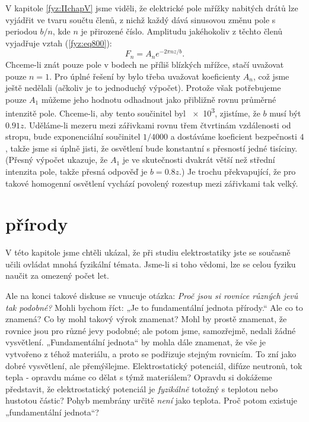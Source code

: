     V kapitole \ref{fyz:IIchapV} jsme viděli, že elektrické pole mřížky nabitých drátů lze vyjádřit
    ve tvaru součtu členů, z nichž každý dává sinusovou změnu pole s periodou \(b/n\), kde \(n\) je
    přirozené číslo. Amplitudu jakéhokoliv z těchto členů vyjadřuje vztah (\ref{fyz:eq800}):
    \begin{equation*}
      F_n=A_ne^{−2πnz/b}.
    \end{equation*}
    Chceme-li znát pouze pole v bodech ne příliš blízkých mřížce, stačí uvažovat pouze \(n=1\). Pro
    úplné řešení by bylo třeba uvažovat koeficienty \(A_n\), což jsme ještě nedělali (ačkoliv je to
    jednoduchý výpočet). Protože však potřebujeme pouze \(A_1\) můžeme jeho hodnotu odhadnout jako
    přibližně rovnu průměrné intenzitě pole. Chceme-li, aby tento součinitel byl \num{e3}, zjistíme,
    že \(b\) musí být \(\num{0.91}z\). Uděláme-li mezeru mezi zářivkami rovnu třem čtvrtinám
    vzdálenosti od stropu, bude exponenciální součinitel \(1/4000\) a dostáváme koeficient
    bezpečnosti \(4\), takže jsme si úplně jisti, že osvětlení bude konstantní s přesností jedné
    tisíciny. (Přesný výpočet ukazuje, že \(A_1\) je ve skutečnosti dvakrát větší než střední
    intenzita pole, takže přesná odpověď je \(b = \num{0.8}z\).) Je trochu překvapující, že pro
    takové homogenní osvětlení vychází povolený rozestup mezi zářivkami tak velký.

  \section{ přírody}\label{fyz:IIchapXIIsecVII}
  
    V této kapitole jsme chtěli ukázal, že při studiu elektrostatiky jste se současně učili ovládat
    mnohá fyzikální témata. Jsme-li si toho vědomi, lze se celou fyziku naučit za omezený počet let.
    
    Ale na konci takové diskuse se vnucuje otázka: \emph{Proč jsou si rovnice různých jevů tak
    podobné?} Mohli bychom říct: „Je to fundamentální jednota přírody.“ Ale co to znamená? Co by
    mohl takový výrok znamenat? Mohl by prostě znamenat, že rovnice jsou pro různé jevy podobné; ale
    potom jsme, samozřejmě, nedali žádné vysvětlení. „Fundamentální jednota“ by mohla dále znamenat,
    že vše je vytvořeno z téhož materiálu, a proto se podřizuje stejným rovnicím. To zní jako dobré
    vysvětlení, ale přemýšlejme. Elektrostatický potenciál, difúze neutronů, tok tepla - opravdu
    máme co dělat s týmž materiálem? Opravdu si dokážeme představit, že elektrostatický potenciál je
    \emph{fyzikálně} totožný s teplotou nebo hustotou částic? Pohyb membrány určitě \emph{není} jako
    teplota. Proč potom existuje „fundamentální jednota“?
    
